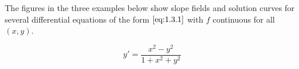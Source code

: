 \documentclass{ximera}
\begin{document}
 

 

The figures in the three examples below show slope fields and solution
curves for several differential equations of the form $\eqref{eq:1.3.1}$ with $f$
 continuous for all $(x,y)$.
 \begin{example}\label{ex:fig010302}
$$
 y'=\frac{x^2-y^2}{1+x^2+y^2}
 $$

 \begin{center}  
\end{center}

\end{example}
 
\end{document}
